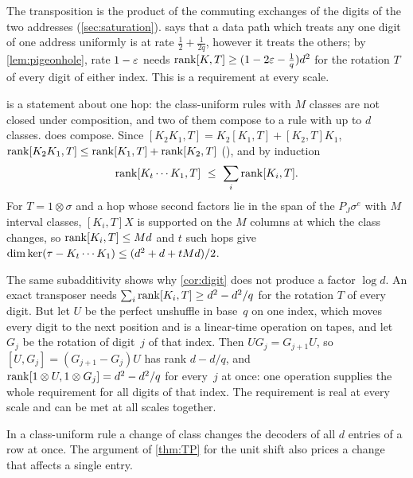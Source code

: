 The transposition is the product of the commuting exchanges of the digits of the two addresses
(\cref{sec:saturation}).  says that a data path which treats any one digit of one address uniformly
is at rate $\tfrac12+\tfrac1{2q}$, however it treats the others; by \cref{lem:pigeonhole}, rate $1-\varepsilon$ needs
$\operatorname{rank}[K,T]\ge(1-2\varepsilon-\tfrac1q)d^2$ for the rotation $T$ of every digit of either index. This is a requirement at
every scale.

\begin{remark}\label{rem:compose-TP}
 is a statement about one hop: the class-uniform rules with $M$ classes are not closed under
composition, and two of them compose to a rule with up to $d$ classes.  does compose. Since
$[K_2K_1,T]=K_2[K_1,T]+[K_2,T]K_1$, $\operatorname{rank}[K_2K_1,T]\le\operatorname{rank}[K_1,T]+\operatorname{rank}[K_2,T]$
(), and by induction
\[
  \operatorname{rank}[K_t\cdots K_1,T]\ \le\ \sum_i\operatorname{rank}[K_i,T].
\]
For $T=1\otimes\sigma$ and a hop whose second factors lie in the span of the $P_J\sigma^e$ with $M$ interval classes,
$[K_i,T]X$ is supported on the $M$ columns at which the class changes, so $\operatorname{rank}[K_i,T]\le Md$ and $t$ such hops give
$\dim\ker(\tau-K_t\cdots K_1)\le(d^2+d+tMd)/2$.

The same subadditivity shows why \cref{cor:digit} does not produce a factor $\log d$. An exact transposer needs
$\sum_i\operatorname{rank}[K_i,T]\ge d^2-d^2/q$ for the rotation $T$ of every digit. But let $U$ be the perfect unshuffle in base~$q$
on one index, which moves every digit to the next position and is a linear-time operation on tapes, and let $G_j$ be
the rotation of digit~$j$ of that index. Then $UG_j=G_{j+1}U$, so $[U,G_j]=(G_{j+1}-G_j)U$ has rank $d-d/q$, and
$\operatorname{rank}[1\otimes U,1\otimes G_j]=d^2-d^2/q$ for every~$j$ at once: one operation supplies the whole requirement for all
digits of that index. The requirement is real at every scale and can be met at all scales together.
\end{remark}

In a class-uniform rule a change of class changes the decoders of all $d$ entries of a row at once. The argument of
\cref{thm:TP} for the unit shift also prices a change that affects a single entry.

